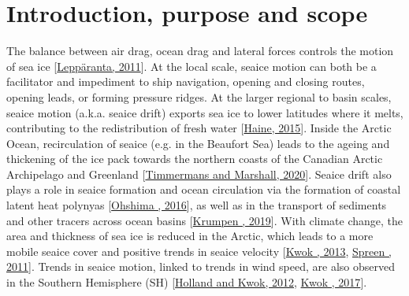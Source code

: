 \documentclass[letterpaper,10pt,english]{jupyterBook}
\begin{document}
\sphinxstepscope


\chapter{Introduction, purpose and scope}
\label{\detokenize{introduction_purpose_scope:introduction-purpose-and-scope}}\label{\detokenize{introduction_purpose_scope::doc}}
\sphinxAtStartPar
The balance between air drag, ocean drag and lateral forces controls the motion of sea ice {[}\hyperlink{cite.references:id21}{Leppäranta, 2011}{]}.
At the local scale, sea\sphinxhyphen{}ice motion can both be a facilitator and impediment to ship navigation, opening and closing routes, opening leads, or forming pressure ridges.
At the larger regional to basin scales, sea\sphinxhyphen{}ice motion (a.k.a. sea\sphinxhyphen{}ice drift) exports sea ice to lower latitudes where it melts, contributing to the redistribution of fresh water {[}\hyperlink{cite.references:id8}{Haine, 2015}{]}.
Inside the Arctic Ocean, re\sphinxhyphen{}circulation of sea\sphinxhyphen{}ice (e.g. in the Beaufort Sea) leads to the ageing and thickening of the ice pack towards the northern coasts of the Canadian Arctic Archipelago and Greenland {[}\hyperlink{cite.references:id31}{Timmermans and Marshall, 2020}{]}.
Sea\sphinxhyphen{}ice drift also plays a role in sea\sphinxhyphen{}ice formation and ocean circulation via the formation of coastal latent heat polynyas {[}\hyperlink{cite.references:id28}{Ohshima , 2016}{]}, as well as in the transport of sediments and other tracers across ocean basins
{[}\hyperlink{cite.references:id12}{Krumpen , 2019}{]}. With climate change, the area and thickness of sea ice is reduced in the Arctic, which leads to a more mobile sea\sphinxhyphen{}ice cover and positive trends in sea\sphinxhyphen{}ice velocity {[}\hyperlink{cite.references:id16}{Kwok , 2013}, \hyperlink{cite.references:id30}{Spreen , 2011}{]}.
Trends in sea\sphinxhyphen{}ice motion, linked to trends in wind speed, are also observed in the Southern Hemisphere (SH) {[}\hyperlink{cite.references:id10}{Holland and Kwok, 2012}, \hyperlink{cite.references:id17}{Kwok , 2017}{]}.
\end{document}
